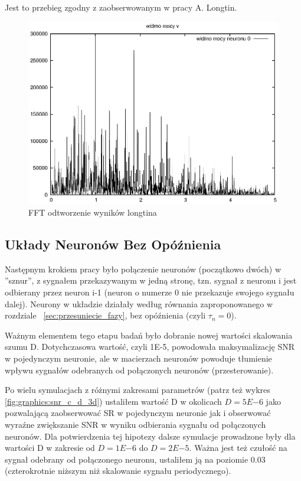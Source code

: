  Jest to przebieg zgodny z zaobserwowanym w pracy A. Longtin.

  \begin{figure}
    \includegraphics[width=140mm]{images/1neuron/3}
    \caption{FFT odtworzenie wyników longtina}
    \label{sym1fft}
  \end{figure}

  
  \subsection{Układy Neuronów Bez Opóźnienia}
  
  Następnym krokiem pracy było połączenie neuronów (początkowo dwóch) w ''sznur'', z sygnałem przekazywanym w jedną stronę, tzn. sygnał z neuronu i jest odbierany przez neuron i-1 (neuron o numerze 0 nie przekazuje swojego sygnału dalej). Neurony w układzie działały według równania zaproponowanego w rozdziale ~\ref{sec:przesuniecie_fazy}, bez opóźnienia (czyli $\tau_{n} = 0$).

  Ważnym elementem tego etapu badań było dobranie nowej wartości skalowania szumu D. Dotychczasowa wartość, czyli 1E-5, powodowała maksymalizację SNR w pojedynczym neuronie, ale w macierzach neuronów powoduje tłumienie wpływu sygnałów odebranych od połączonych neuronów (przesterowanie).

  Po wielu symulacjach z różnymi zakresami parametrów (patrz też wykres \ref{fig:graphics:snr_c_d_3d}) ustaliłem wartość D w okolicach $D=5E{-6}$ jako pozwalającą zaobserwować SR w pojedynczym neuronie jak i obserwować wyraźne zwiększanie SNR w wyniku odbierania sygnału od połączonych neuronów. Dla potwierdzenia tej hipotezy dalsze symulacje prowadzone były dla wartości D w zakresie od $D=1E{-6}$ do $D=2E{-5}$. Ważna jest też czułość na sygnał odebrany od połączonego neuronu, ustaliłem ją na poziomie 0.03 (czterokrotnie niższym niż skalowanie sygnału periodycznego).

